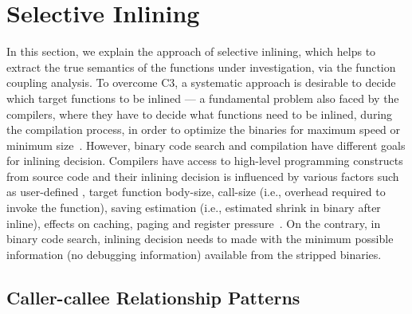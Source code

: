 \section{Selective Inlining}\label{sec:inline}
In this section, we explain the approach of selective inlining, which helps to extract the true semantics of the functions under investigation, via the function coupling analysis.
To overcome C3, a systematic approach is desirable to decide which target functions to be inlined --- a fundamental problem also faced by the compilers, where they have to decide what functions need to be inlined, during the compilation process, in order to optimize the binaries for maximum speed or minimum size~\cite{chang1992profile}. 
However, binary code search and compilation have different goals for inlining decision. Compilers have access to high-level programming constructs from source code and their inlining decision is influenced by various factors such as user-defined , target function body-size, call-size (i.e., overhead required to invoke the function), saving estimation (i.e., estimated shrink in binary after inline), effects on caching, paging and register pressure~\cite{chang1992profile}. On the contrary, in binary code search, 
inlining decision needs to made with the minimum possible information (no debugging information) available from the stripped binaries.

\subsection{Caller-callee Relationship Patterns}

